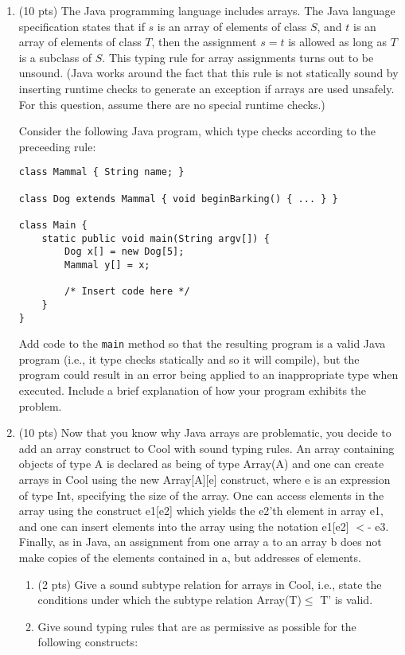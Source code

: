 \documentclass[10pt]{article}
\begin{document}
\begin{enumerate}
\medskip
\item (10 pts) The Java programming language includes arrays.  The Java
language specification states that if $s$ is an array of elements of
class $S$, and $t$ is an array of elements of class $T$, then the
assignment $s = t$ is allowed as long as $T$ is a subclass of $S$.
This typing rule for array assignments turns out to be unsound. (Java
works around the fact that this rule is not statically sound by inserting
runtime checks to generate an exception if arrays are used
unsafely. For this question, assume there are no special runtime checks.)

Consider the following Java program, which type checks according
to the preceeding rule:
\begin{verbatim}
class Mammal { String name; }

class Dog extends Mammal { void beginBarking() { ... } }

class Main {
    static public void main(String argv[]) {
        Dog x[] = new Dog[5];
        Mammal y[] = x;

        /* Insert code here */
    }
}
\end{verbatim}
Add code to the \texttt{main} method so that the resulting program is
a valid Java program (i.e., it type checks statically and so it will
compile), but the program could result in an error being applied
to an inappropriate type when executed.  Include a brief explanation
of how your program exhibits the problem.

\medskip
\item (10 pts) Now that you know why Java arrays are problematic, you decide to add an array construct
to Cool with sound typing rules. An array containing objects of type A is declared as being of type
\textsf{Array(A)} and one can create arrays in Cool using the \textsf{new Array[A][e]} construct, where \textsf{e} is an
expression of type \textsf{Int}, specifying the size of the array.
One can access elements in the array using
the construct \textsf{e1[e2]} which yields the \textsf{e2}'th element in array \textsf{e1},
and one can insert elements into the array using the notation \textsf{e1[e2] $<$- e3}.
Finally, as in Java, an assignment from one array \textsf{a} to an
array \textsf{b} does not make copies of the elements contained in \textsf{a}, but addresses of elements.

\begin{enumerate}
  \item (2 pts) Give a sound subtype relation for arrays in Cool, i.e., state the conditions under which
the subtype relation \textsf{Array(T)$\le$ T'} is valid.
  \item Give sound typing rules that are as permissive as possible for the following constructs:


\end{enumerate}
\end{enumerate}
\end{document}
